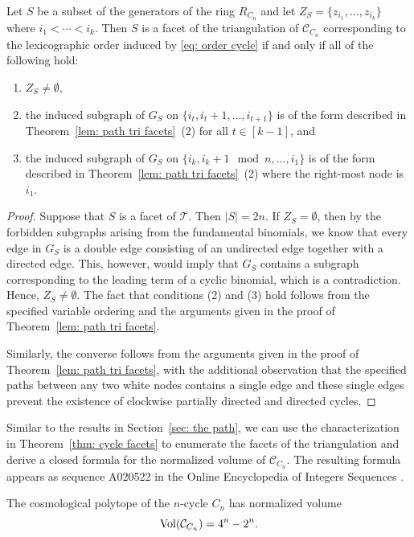 \begin{theo}
\label{thm: cycle facets}
Let $S$ be a subset of the generators of the ring $R_{C_{n}}$ and let $Z_S = \{z_{i_1},\ldots, z_{i_k}\}$ where $i_1<\cdots < i_k$.  
Then $S$ is a facet of the triangulation of $\mathcal{C}_{C_{n}}$ corresponding to the lexicographic order induced by \eqref{eq: order cycle} if and only if all of the following hold:
\begin{enumerate}
    \item $Z_S\neq \emptyset$,
    \item the induced subgraph of $G_S$ on $\{i_t, i_t+1,\ldots, i_{t+1}\}$ is of the form described in Theorem~\ref{lem: path tri facets}~(2) for all $t\in[k-1]$, and
    \item the induced subgraph of $G_S$ on $\{i_k, i_k+1 \mod n,\ldots, i_{1}\}$ is of the form described in Theorem~\ref{lem: path tri facets}~(2) where the right-most node is $i_1$.
\end{enumerate}
\end{theo}

\begin{proof}
Suppose that $S$ is a facet of $\mathcal{T}$.  
Then $|S| = 2n$. 
If $Z_S = \emptyset$, then by the forbidden subgraphs arising from the fundamental binomials, we know that every edge in $G_S$ is a double edge consisting of an undirected edge together with a directed edge. 
This, however, would imply that $G_S$ contains a subgraph corresponding to the leading term of a cyclic  binomial, which is a contradiction. 
Hence, $Z_S\neq \emptyset$. 
The fact that conditions (2) and (3) hold follows from the specified variable ordering and the arguments given in the proof of Theorem~\ref{lem: path tri facets}.

Similarly, the converse follows from the arguments given in the proof of Theorem~\ref{lem: path tri facets}, with the additional observation that the specified paths between any two white nodes contains a single edge and these single edges prevent the existence of clockwise partially directed and directed cycles. 
\end{proof}

Similar to the results in Section~\ref{sec: the path}, we can use the characterization in Theorem~\ref{thm: cycle facets} to enumerate the facets of the triangulation and derive a closed formula for the normalized volume of $\mathcal{C}_{C_n}$. 
The resulting formula appears as sequence A020522 in the Online Encyclopedia of Integers Sequences \cite{OEIS}. 
\begin{theo}\label{thm : vol cycle}
    The cosmological polytope of the $n$-cycle $C_n$ has normalized volume
    \[
        \textnormal{Vol}(\mathcal{C}_{C_n})=4^n-2^n.
    \]
\end{theo}


